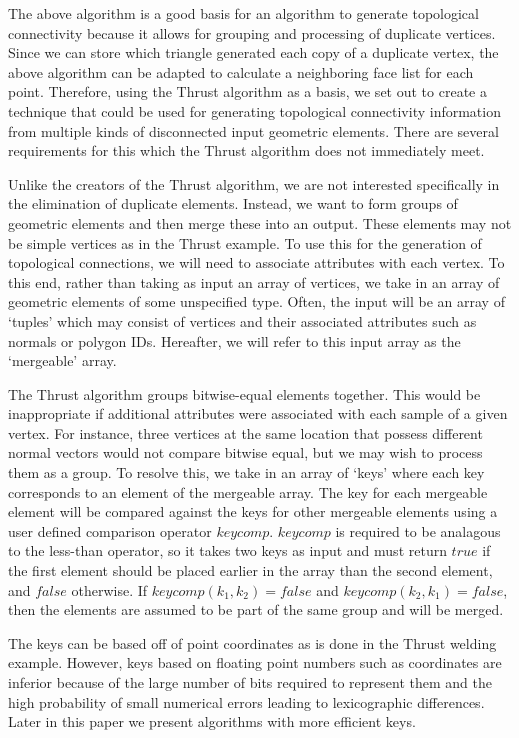 \documentclass[journal]{vgtc}                %
\begin{document}
The above algorithm is a good basis for an algorithm to generate topological connectivity because it allows for
grouping and processing of duplicate vertices. Since we can store which triangle generated each copy of a duplicate vertex,
 the above algorithm can be adapted to calculate a neighboring face list for each point. Therefore, using the Thrust
algorithm as a basis, we set out to create a technique that could be used for generating topological connectivity information 
from multiple kinds of disconnected input geometric elements. There are several requirements for this which the Thrust algorithm
does not immediately meet.

Unlike the creators of the Thrust algorithm, we are not interested specifically in the elimination of duplicate elements. Instead, we want
to form groups of geometric elements and then merge these into an output. These elements may not be simple vertices as in the Thrust example.
To use this for the generation of topological connections, we will need to associate attributes with each vertex. To this end, rather than taking as input an array of vertices,
we take in an array of geometric elements of some unspecified type. Often, the input will be an array of `tuples' which may consist of
vertices and their associated attributes such as normals or polygon IDs. Hereafter, we will refer to this input array as the `mergeable' array.

The Thrust algorithm groups bitwise-equal elements together. 
This would be inappropriate if additional attributes were associated with
each sample of a given vertex. For instance, three vertices at the same location that possess different normal vectors
would not compare bitwise equal, but we may wish to process them as a group. To resolve this, we take in an array of `keys' where
each key corresponds to an element of the mergeable array. The key for each mergeable element will be compared against the keys for
other mergeable elements using a user defined comparison operator $keycomp$. $keycomp$ is required to be analagous to the less-than operator, so
it takes two keys as input and must return $true$ if the first element should be placed earlier in the array than the second element, and $false$
otherwise. If $keycomp(k_1, k_2) = false$ and $keycomp(k_2, k_1) = false$, then the elements are assumed to be part of the same group and will be merged.

The keys can be based off of point coordinates as is done in the Thrust welding example. However, keys based on floating point numbers such as coordinates are inferior because of the large number of bits required to represent them and the high probability of small numerical errors leading to lexicographic differences. Later in this paper we present algorithms with more efficient keys.
\end{document}
